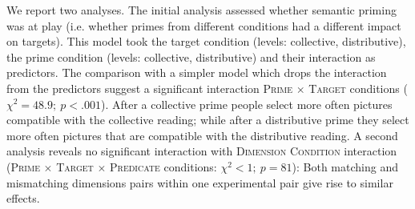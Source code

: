 \documentclass[a4paper, 11pt]{article}
\begin{document}
We report two analyses. The initial analysis assessed whether semantic priming was at play (i.e. whether primes from different conditions had a different impact on targets). This model took the target condition (levels: collective, distributive), the prime condition (levels: collective, distributive) and their interaction as predictors. 
The comparison with a simpler model which drops the interaction from the predictors suggest a significant interaction \textsc{Prime} $\times$ \textsc{Target} conditions ($\chi^{2}=48.9; \ p<.001$). 
After a collective prime people select more often pictures compatible with the collective reading; while after a distributive prime they select more often pictures that are compatible with the distributive reading. 
A second analysis reveals no significant interaction with \textsc{Dimension Condition} interaction (\textsc{Prime} $\times$ \textsc{Target} $\times$ \textsc{Predicate} conditions: $\chi^{2}<1; \ p=81$): Both matching and mismatching dimensions pairs within one experimental pair give rise to similar effects. 
\end{document}

